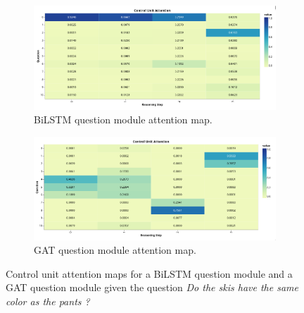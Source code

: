 \begin{figure}[htbp]
    \centering
    \begin{subfigure}[l]{0.5\textwidth}
        \includegraphics[width=\textwidth]{figures/qav/qav_cu.png}
        \caption{BiLSTM question module attention map.}
    \end{subfigure}
    \begin{subfigure}[r]{0.49\textwidth}
        \includegraphics[width=\textwidth]{figures/qav/qav_gat_cu.png}
        \caption{GAT question module attention map.}
    \end{subfigure}
    \caption[Control unit attention maps for BiLSTM and GAT question processing modules.]{Control unit attention maps for a BiLSTM question module and a GAT question module given the question \textit{Do the skis have the same color as the pants ?}}
    \label{fig:bilstm_gat_control_attention_maps}
\end{figure}


